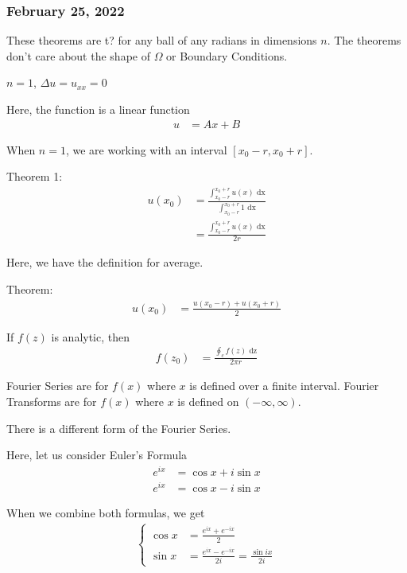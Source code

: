 \documentclass{article}
\begin{document}
\newpage

\subsubsection*{February 25, 2022}
\note These theorems are t? for any ball of any radians in dimensions $n$.
The theorems don't care about the shape of $\Omega$ or Boundary Conditions.

\ex $n = 1$, $\Delta u = u_{xx} = 0$

Here, the function is a linear function
%
\begin{align}
  u & = Ax + B
\end{align}

When $n = 1$, we are working with an interval $[x_0 - r, x_0 + r]$.

Theorem 1:
%
\begin{align}
  u(x_0) & = \frac
  {
    \int^{x_0 + r}_{x_0 - r} u(x) \text{ dx}
  }
  {
    \int^{x_0 + r}_{x_0 - r} 1 \text{ dx}
  }\\
  & = \frac
  {
    \int^{x_0 + r}_{x_0 - r} u(x) \text{ dx}
  }
  {
    2r
  }
\end{align}

Here, we have the definition for average.

Theorem:
%
\begin{align}
  u(x_0) & =
  \frac
  {
    u(x_0 - r) + u(x_0 + r)
  }
  {
    2
  }
\end{align}


If $f(z)$ is analytic, then
%
\begin{align}
  f(z_0) & =
  \frac
  {
    \oint_c f(z) \text{ dz}
  }
  {
    2 \pi r
  }
\end{align}

Fourier Series are for $f(x)$ where $x$ is defined over a finite interval.
Fourier Transforms are for $f(x)$ where $x$ is defined on $(-\infty, \infty)$.

There is a different form of the Fourier Series.

Here, let us consider Euler's Formula
%
\begin{align}
  e^{ix} & = \cos x + i \sin x\\
  e^{ix} & = \cos x - i \sin x
\end{align}

When we combine both formulas, we get
%
\begin{align}
  \begin{cases}
    \cos x& = \frac{e^{ix} + e^{-ix}}{2}\\
    \sin x & = \frac{e^{ix} - e^{-ix}}{2i} = \frac{\sin ix}{2i}
  \end{cases}
\end{align}
\end{document}
